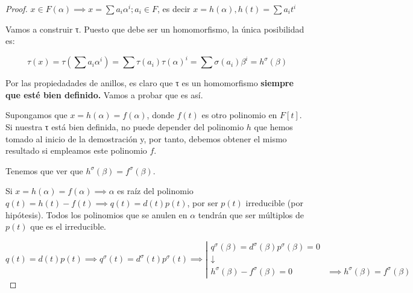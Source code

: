 \documentclass{apuntes}
\begin{document}
\begin{proof}

$x ∈ F(α) \implies x = \sum a_iα^i; a_i∈F$, es decir $x=h(α),h(t)=\sum a_it^i$

Vamos a construir τ. Puesto que debe ser un homomorfismo, la única posibilidad es:

\[τ(x) = τ(\sum a_iα^i) = \sum τ(a_i)τ(α)^i = \sum σ(a_i)β^i = h^σ(β)\]

Por las propiedadades de anillos, es claro que τ es un homomorfismo \textbf{siempre que esté bien definido.} Vamos a probar que es así.

Supongamos que $x=h(α) = f(α)$, donde $f(t)$ es otro polinomio en $F[t]$. Si nuestra τ está bien definida, no puede depender del polinomio $h$ que hemos tomado al inicio de la demostración y, por tanto, debemos obtener el mismo resultado si empleamos este polinomio $f$.

Tenemos que ver que $h^σ(β) = f^σ(β)$.

Si $x= h(α) = f(α) \implies α$ es raíz del polinomio $q(t) = h(t)-f(t) \implies q(t) = d(t)p(t)$, por ser $p(t)$ irreducible (por hipótesis). Todos los polinomios que se anulen en $α$ tendrán que ser múltiplos de $p(t)$ que es el irreducible.

\[q(t) = d(t)p(t) \implies q^σ(t) = d^σ(t) p^σ(t) \implies \left| \begin{array}{cc}
q^σ(β) = d^σ(β) p^σ(β) = 0&\\
\downarrow&\\
h^σ(β) - f^σ(β)=0&\implies h^σ(β) = f^σ(β)
\end{array}\right.\]
\end{proof}




\end{document}
